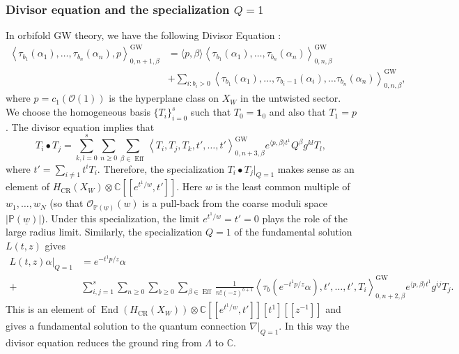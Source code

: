 \documentclass[11pt]{amsart}
\theoremstyle{definition} %
\theoremstyle{remark} %
\newcommand{\CC}{\mathbb C}
\newcommand{\PP}{\mathbb P}
\newcommand{\End}{\operatorname{End}}
\def\GW{\operatorname{\text{GW}}}
\def\CR{\operatorname{\text{CR}}}
\def\corr#1{\left\langle #1 \right\rangle}
\def\pair#1#2{\langle #1, #2\rangle}
\newcommand{\cO}{\mathcal{O}}
\newcommand{\unit}{\boldsymbol{1}}
\renewcommand{\GW}{{\operatorname{GW}}}
\renewcommand{\CR}{{\operatorname{CR}}}
\newcommand{\Eff}{\operatorname{Eff}}
\newcommand{\uw}{\underline{w}}
\begin{document}
\subsubsection{Divisor equation and the specialization 
$Q=1$} 
\label{subsubsec:Q=1} 
In orbifold GW theory, we have the following 
Divisor Equation \cite[Theorem 8.3.1]{AGV}: 
\begin{align*} 
\corr{\tau_{b_1} (\alpha_1),\dots, \tau_{b_n}(\alpha_n), p
}_{0,n+1,\beta}^{\GW} 
& = \pair{p}{\beta} \corr{\tau_{b_1}(\alpha_1), \dots, 
\tau_{b_n}(\alpha_n)}_{0,n,\beta}^{\GW} \\
& + \sum_{i: b_i>0} 
\corr{\tau_{b_1}(\alpha_1), \dots, \tau_{b_i-1}(\alpha_i), 
\dots \tau_{b_n}(\alpha_n)}_{0,n,\beta}^{\GW}, 
\end{align*} 
where $p=c_1(\cO(1))$ is the hyperplane class on $X_W$ 
in the untwisted sector.  
We choose the homogeneous basis $\{T_i\}_{i=0}^s$ 
such that $T_0 = \unit_0$ and also that $T_1 = p$.  
The divisor equation implies that 
\[
T_i \bullet T_j = \sum_{k,l=0}^s \sum_{n\ge 0} 
\sum_{\beta \in \Eff} 
\corr{T_i,T_j,T_k,t',\dots,t'}_{0,n+3,\beta}^{\GW} 
e^{\pair{p}{\beta}t^1} Q^\beta g^{kl} T_l, 
\]
where $t' = \sum_{i\neq 1} t^i T_i$. 
Therefore, the specialization $T_i\bullet T_j|_{Q=1}$ 
makes sense as an element of 
$H_{\CR}(X_W)\otimes \CC[\![e^{t^1/w}, t']\!]$.  
Here $w$ is the least common multiple of $w_1,\dots,w_N$
(so that $\cO_{\PP(\uw)}(w)$ is a pull-back from the coarse moduli 
space $|\PP(\uw)|$). 
Under this specialization, the limit $e^{t^1/w} = t' =0$ plays the 
role of the large radius limit. 
Similarly, the specialization $Q=1$ of the fundamental 
solution $L(t,z)$ gives 
\begin{align*} 
L(t,z) \alpha  \Bigr|_{Q=1} 
& = e^{-t^1 p/z} \alpha \\ 
 + &\sum_{i,j=1}^s \sum_{n\ge 0} \sum_{b\ge 0} 
\sum_{\beta\in \Eff} 
\frac{1}{n! (-z)^{b+1}}  
 \corr{ \tau_b (e^{-t^1 p/z} \alpha), 
t',\dots,t', T_i}_{0,n+2,\beta}^{\GW} e^{\pair{p}{\beta} t^1} 
g^{ij} T_j.  
\end{align*} 
This is an element of $\End(H_{\CR}(X_W))\otimes 
\CC[\![e^{t^1/w},t']\!][t^1][\![z^{-1}]\!]$ 
and gives a fundamental solution to 
the quantum connection $\nabla|_{Q=1}$. 
In this way the divisor equation reduces 
the ground ring from $\Lambda$ to $\CC$. 
\end{document}
